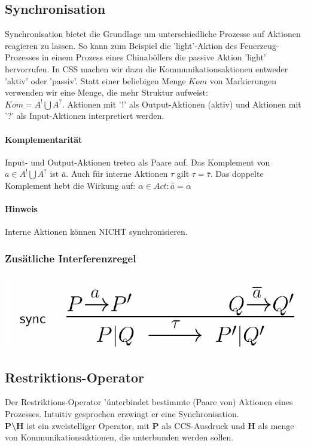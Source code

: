 \documentclass[a4paper,10pt, oneside]{book}
\begin{document}
\subsection{Synchronisation}
Synchronisation bietet die Grundlage um unterschiedliche Prozesse auf Aktionen reagieren zu lassen. So kann zum Beispiel die 'light'-Aktion des Feuerzeug-Prozesses in einem Prozess eines Chinaböllers die passive Aktion 'light' hervorrufen.
In CSS machen wir dazu die Kommunikationsaktionen entweder 'aktiv' oder 'passiv'. Statt einer beliebigen Menge $Kom$ von Markierungen verwenden wir eine Menge, die mehr Struktur aufweist:\\
$Kom = A^! \bigcup A^?$. Aktionen mit '!' als Output-Aktionen (aktiv) und Aktionen mit '?' als Input-Aktionen interpretiert werden.


\paragraph{Komplementarität}
Input- und Output-Aktionen treten als Paare auf. Das Komplement von $a \in A^! \bigcup A^?$ ist $\bar{a}$. Auch für interne Aktionen $\tau$ gilt $\tau = \bar{\tau}$. Das doppelte Komplement hebt die Wirkung auf: $\alpha \in Act: \bar{\bar{a}} = \alpha$

\paragraph{Hinweis} Interne Aktionen können NICHT synchronisieren.

\subsubsection{Zusätliche Interferenzregel}
\begin{center}
\includegraphics[scale=0.3]{sync_regel}
\end{center}

\subsection{Restriktions-Operator}
Der Restriktions-Operator '\' unterbindet bestimmte (Paare von) Aktionen eines Prozesses. Intuitiv gesprochen erzwingt er eine Synchronisation.\\
\textbf{P\textbackslash H} ist ein zweistelliger Operator, mit \textbf{P} als CCS-Ausdruck und \textbf{H} als menge von Kommunikationsaktionen, die unterbunden werden sollen.
\end{document}
